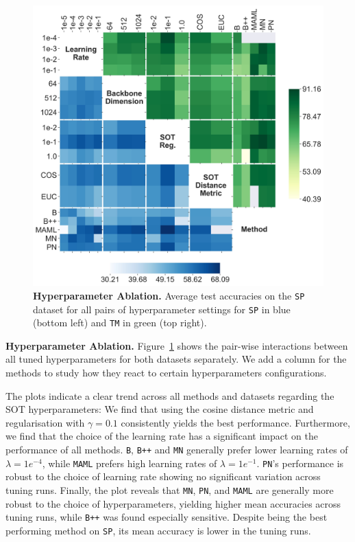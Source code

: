 \begin{figure}[h!]
    \centering
    \includegraphics[width=1\columnwidth]{figures/hparams-interaction-combined.png}
    \caption{\textbf{Hyperparameter Ablation.} Average test accuracies on the \texttt{SP} dataset for all pairs of hyperparameter settings for \texttt{SP} in blue (bottom left) and \texttt{TM} in green (top right).}
    \label{fig:hparams-swissprot-grid}
\end{figure}

\textbf{Hyperparameter Ablation.} Figure~\ref{fig:hparams-swissprot-grid} shows the pair-wise interactions between all tuned hyperparameters for both datasets separately. We add a column for the methods to study how they react to certain hyperparameters configurations. 

The plots indicate a clear trend across all methods and datasets regarding the SOT hyperparameters: We find that using the cosine distance metric and regularisation with $\gamma = 0.1$ consistently yields the best performance. 
Furthermore, we find that the choice of the learning rate has a significant impact on the performance of all methods. \texttt{B}, \texttt{B++} and \texttt{MN} generally prefer lower learning rates of $\lambda=1e^{-4}$, while \texttt{MAML} prefers high learning rates of $\lambda=1e^{-1}$. \texttt{PN}'s performance is robust to the choice of learning rate showing no significant variation across tuning runs.
Finally, the plot reveals that \texttt{MN}, \texttt{PN}, and \texttt{MAML} are generally more robust to the choice of hyperparameters, yielding higher mean accuracies across tuning runs, while  \texttt{B++} was found especially sensitive. Despite being the best performing method on \texttt{SP}, its mean accuracy is lower in the tuning runs.



